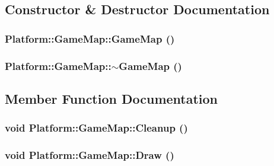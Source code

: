 \subsection{Constructor \& Destructor Documentation}
\hypertarget{class_platform_1_1_game_map_9388eca457dc888ce1370138b873a29e}{
\subsubsection[{GameMap}]{\setlength{\rightskip}{0pt plus 5cm}Platform::GameMap::GameMap ()}}
\label{de/db6/class_platform_1_1_game_map_9388eca457dc888ce1370138b873a29e}


\hypertarget{class_platform_1_1_game_map_ad7094a561f89baf77d2015768dd9808}{
\subsubsection[{$\sim$GameMap}]{\setlength{\rightskip}{0pt plus 5cm}Platform::GameMap::$\sim$GameMap ()}}
\label{de/db6/class_platform_1_1_game_map_ad7094a561f89baf77d2015768dd9808}




\subsection{Member Function Documentation}
\hypertarget{class_platform_1_1_game_map_3a2969cccbc16f1ad11e505da961a105}{
\subsubsection[{Cleanup}]{\setlength{\rightskip}{0pt plus 5cm}void Platform::GameMap::Cleanup ()}}
\label{de/db6/class_platform_1_1_game_map_3a2969cccbc16f1ad11e505da961a105}


\hypertarget{class_platform_1_1_game_map_87236fed25c6729fd3d139170cbda6a0}{
\subsubsection[{Draw}]{\setlength{\rightskip}{0pt plus 5cm}void Platform::GameMap::Draw ()}}
\label{de/db6/class_platform_1_1_game_map_87236fed25c6729fd3d139170cbda6a0}



